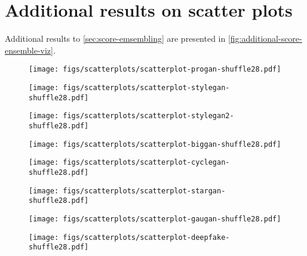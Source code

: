 \onecolumn
\section{Additional results on scatter plots} 
\label{sec:additional-results-on-scatter-plots} 
Additional results to \cref{sec:score-emsembling} are presented in \cref{fig:additional-score-ensemble-viz}. 


\begin{figure*}[!ph]
    \centering
    \begin{subfigure}[b]{0.20\linewidth}
        \centering
        \texttt{[image: figs/scatterplots/scatterplot-progan-shuffle28.pdf]}
    \end{subfigure}
    \begin{subfigure}[b]{0.20\linewidth}
        \centering
        \texttt{[image: figs/scatterplots/scatterplot-stylegan-shuffle28.pdf]}
    \end{subfigure}
    \begin{subfigure}[b]{0.20\linewidth}
        \centering
        \texttt{[image: figs/scatterplots/scatterplot-stylegan2-shuffle28.pdf]}
    \end{subfigure}
    \begin{subfigure}[b]{0.20\linewidth}
        \centering
        \texttt{[image: figs/scatterplots/scatterplot-biggan-shuffle28.pdf]}
    \end{subfigure}
    \begin{subfigure}[b]{0.20\linewidth}
        \centering
        \texttt{[image: figs/scatterplots/scatterplot-cyclegan-shuffle28.pdf]}
    \end{subfigure}
    \begin{subfigure}[b]{0.20\linewidth}
        \centering
        \texttt{[image: figs/scatterplots/scatterplot-stargan-shuffle28.pdf]}
    \end{subfigure}
    \begin{subfigure}[b]{0.20\linewidth}
        \centering
        \texttt{[image: figs/scatterplots/scatterplot-gaugan-shuffle28.pdf]}
    \end{subfigure}
    \begin{subfigure}[b]{0.20\linewidth}
        \centering
        \texttt{[image: figs/scatterplots/scatterplot-deepfake-shuffle28.pdf]}

\end{subfigure}
\end{figure*}
